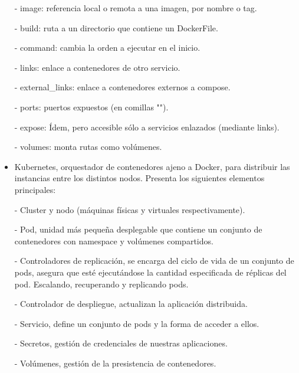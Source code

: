 \documentclass[12pt]{amsart}
\begin{document}
\begin{itemize}
    \subitem - image: referencia local o remota a una imagen, por nombre o tag.
    
    \subitem - build: ruta a un directorio que contiene un DockerFile.
    
    \subitem - command: cambia la orden a ejecutar en el inicio.
    
    \subitem - links: enlace a contenedores de otro servicio.
    
    \subitem - external\_links: enlace a contenedores externos a compose.
    
    \subitem - ports: puertos expuestos (en comillas "").
    
    \subitem - expose: Ídem, pero accesible sólo a servicios enlazados (mediante links).
    
    \subitem - volumes: monta rutas como volúmenes.
    
    \item Kubernetes, orquestador de contenedores ajeno a Docker, para distribuir las instancias entre los distintos nodos. Presenta los siguientes elementos principales:
    
    \subitem - Cluster y nodo (máquinas físicas y virtuales respectivamente).
    
    \subitem - Pod, unidad más pequeña desplegable que contiene un conjunto de contenedores con namespace y volúmenes compartidos.
    
    \subitem - Controladores de replicación, se encarga del ciclo de vida de un conjunto de pods, asegura que esté ejecutándose la cantidad especificada de réplicas del pod. Escalando, recuperando y replicando pods.
    
    \subitem - Controlador de despliegue, actualizan la aplicación distribuida.
    
    \subitem - Servicio, define un conjunto de pods y la forma de acceder a ellos.
    
    \subitem - Secretos, gestión de credenciales de nuestras aplicaciones.
    
    \subitem - Volúmenes, gestión de la presistencia de contenedores.
    
    \end{itemize}
    
    
    \pagebreak
    
    
\end{document}
